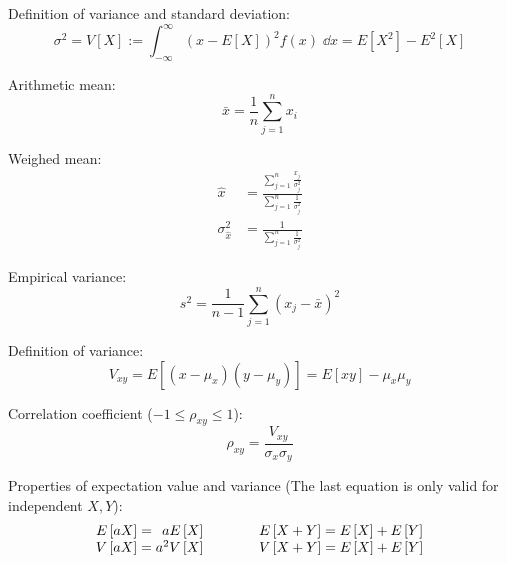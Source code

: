 			\noindent
			Definition of variance and standard deviation:
			\begin{equation}
				\sigma^2 = V\left[ X \right] := \int_{-\infty}^{\infty} (x-E\left[X\right])^2f(x)\;\dd x = E\left[X^2\right]-E^2\left[X\right]
			\end{equation}

			\noindent
			Arithmetic mean:
			\begin{equation}
				\bar{x}=\frac{1}{n}\sum_{j=1}^n x_i
			\end{equation}

			\noindent
			Weighed mean:
			\begin{equation}
				\begin{aligned}
					\hat{x} &= \frac{\sum_{j=1}^n \frac{x_j}{\sigma_j^2}}{\sum_{j=1}^n \frac{1}{\sigma_j^2}} \\
					\sigma_{\hat{x}}^2 &= \frac{1}{\sum_{j=1}^n \frac{1}{\sigma_j^2}}
				\end{aligned}
			\end{equation}

			\noindent
			Empirical variance:
			\begin{equation}
				s^2 = \frac{1}{n-1}\sum_{j=1}^n (x_j-\bar{x})^2
			\end{equation}

			\noindent
			Definition of variance:
			\begin{equation}
				V_{xy} = E\left[(x-\mu_x)(y-\mu_y)\right] = E\left[xy\right]-\mu_x\mu_y
			\end{equation}

			\noindent
			Correlation coefficient ($-1\le\rho_{xy}\le 1$):
			\begin{equation}
				\rho_{xy} = \frac{V_{xy}}{\sigma_x\sigma_y}
			\end{equation}

			\noindent
			Properties of expectation value and variance (The last equation is only valid for independent $X, Y$):
			\begin{equation}
				\begin{array}{rl}
					E\left[aX\right] = \phantom{^2}a E\left[X\right]
					&\hspace{30pt}
					E\left[X+Y\right] = E\left[X\right] + E\left[Y\right]
					\\
					V\left[aX\right] = a^2 V\left[X\right]
					&\hspace{30pt}
					V\left[X+Y\right] = E\left[X\right] + E\left[Y\right]
					\\
				\end{array}
			\end{equation}

